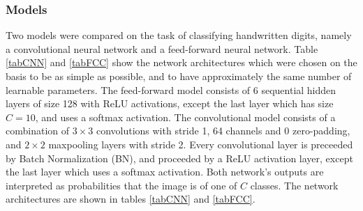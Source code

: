 \documentclass[a4paper, twoside]{article}
\begin{document}
\subsubsection{Models}
Two models were compared on the task of classifying handwritten digits, namely a convolutional neural network and a feed-forward neural network. Table \ref{tabCNN} and \ref{tabFCC} show the network architectures which were chosen on the basis to be as simple as possible, and to have approximately the same number of learnable parameters. The feed-forward model consists of 6 sequential hidden layers of size 128 with ReLU activations, except the last layer which has size $C=10$, and uses a softmax activation. The convolutional model consists of a combination of $3 \times 3$ convolutions with stride 1, 64 channels and 0 zero-padding, and $2 \times 2$ maxpooling layers with stride 2. Every convolutional layer is preceeded by Batch Normalization (BN), and proceeded by a ReLU activation layer, except the last layer which uses a softmax activation. Both network's outputs are interpreted as probabilities that the image is of one of $C$ classes. The network architectures are shown in tables \ref{tabCNN} and \ref{tabFCC}.
\end{document}
